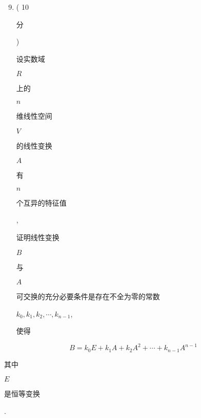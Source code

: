 \documentclass[10pt]{article}
\begin{document}
\begin{enumerate}
  \setcounter{enumi}{8}
  \item ( 10 \begin{CJK}{UTF8}{mj}分\end{CJK}) \begin{CJK}{UTF8}{mj}设实数域\end{CJK} $R$ \begin{CJK}{UTF8}{mj}上的\end{CJK} $n$ \begin{CJK}{UTF8}{mj}维线性空间\end{CJK} $V$ \begin{CJK}{UTF8}{mj}的线性变换\end{CJK} $A$ \begin{CJK}{UTF8}{mj}有\end{CJK} $n$ \begin{CJK}{UTF8}{mj}个互异的特征值\end{CJK}, \begin{CJK}{UTF8}{mj}证明线性变换\end{CJK} $B$ \begin{CJK}{UTF8}{mj}与\end{CJK} $A$ \begin{CJK}{UTF8}{mj}可交换的充分必要条件是存在不全为零的常数\end{CJK} $k_{0}, k_{1}, k_{2}, \cdots, k_{n-1}$, \begin{CJK}{UTF8}{mj}使得\end{CJK}
\end{enumerate}
$$
B=k_{0} E+k_{1} A+k_{2} A^{2}+\cdots+k_{n-1} A^{n-1}
$$
\begin{CJK}{UTF8}{mj}其中\end{CJK} $E$ \begin{CJK}{UTF8}{mj}是恒等变换\end{CJK}.
\end{document}
